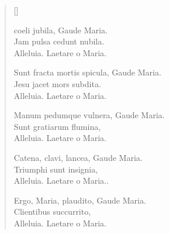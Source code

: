 \newHymn


\begin{verse}[\versewidth]

 coeli jubila, Gaude Maria.\\
Jam pulsa cedunt nubila.\\
Alleluia. Laetare o Maria.


 Sunt fracta mortis spicula, Gaude Maria.\\
Jesu jacet mors subdita.\\
Alleluia. Laetare o Maria.



 Manum pedumque vulnera, Gaude Maria.\\
Sunt gratiarum flumina,\\
Alleluia. Laetare o Maria.



 Catena, clavi, lancea, Gaude Maria.\\
Triumphi sunt insignia,\\
Alleluia. Laetare o Maria..

 Ergo, Maria, plaudito, Gaude Maria.\\
Clientibus succurrito,\\
Alleluia. Laetare o Maria.

\end{verse}
